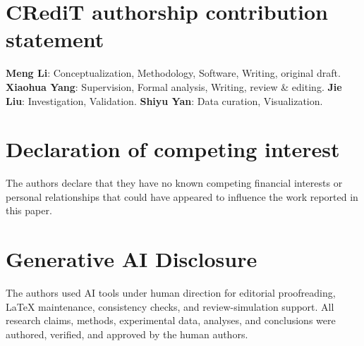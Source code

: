 \documentclass[12pt]{article}
\begin{document}
\section*{CRediT authorship contribution statement}

\textbf{Meng Li}: Conceptualization, Methodology, Software, Writing, original draft. \textbf{Xiaohua Yang}: Supervision, Formal analysis, Writing, review \& editing. \textbf{Jie Liu}: Investigation, Validation. \textbf{Shiyu Yan}: Data curation, Visualization.

\section*{Declaration of competing interest}

The authors declare that they have no known competing financial interests or personal relationships that could have appeared to influence the work reported in this paper.

\section*{Generative AI Disclosure}

The authors used AI tools under human direction for editorial proofreading,
LaTeX maintenance, consistency checks, and review-simulation support. All
research claims, methods, experimental data, analyses, and conclusions were
authored, verified, and approved by the human authors.
\end{document}
